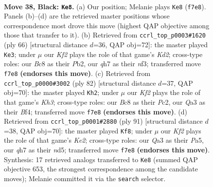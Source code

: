 \documentclass[11pt]{article}
\begin{document}
\clearpage

\begin{figure}[p]\centering
\begin{subfigure}{0.46\textwidth}\centering
\resizebox{\linewidth}{!}{%
\newchessgame
\chessboard[
  setfen={r1b5/5k1Q/2p1p3/p3P3/P4P2/q7/4K3/6N1 b - - 9 38},
  showmover=false,
  pgfstyle=straightmove, color=movearrow, markmove={f7-e8}
]}
\caption{}
\end{subfigure}\hfill
\begin{subfigure}{0.46\textwidth}\centering
\resizebox{\linewidth}{!}{%
\newchessgame
\chessboard[
  setfen={4nbB1/8/p4k2/8/1p6/5n2/PPPK4/7R w - - 0 34},
  showmover=false,
  pgfstyle=straightmove, color=movearrow, markmove={d2-e3}
]}
\caption{}
\end{subfigure}
\\[4pt]
\begin{subfigure}{0.46\textwidth}\centering
\resizebox{\linewidth}{!}{%
\newchessgame
\chessboard[
  setfen={8/3B3p/p4k2/2p2p2/P4B2/6PK/1RP5/5q2 w - - 1 42},
  showmover=false,
  pgfstyle=straightmove, color=movearrow, markmove={h3-h2}
]}
\caption{}
\end{subfigure}\hfill
\begin{subfigure}{0.46\textwidth}\centering
\resizebox{\linewidth}{!}{%
\newchessgame
\chessboard[
  setfen={8/4kp2/8/p2NP1pp/P1B5/4P1Pr/8/3K4 b - - 1 46},
  showmover=false,
  pgfstyle=straightmove, color=movearrow, markmove={e7-f8}
]}
\caption{}
\end{subfigure}
\caption{\textbf{Move 38, Black: \texttt{Ke8}.} (a) Our position; Melanie plays \texttt{Ke8} (\texttt{f7e8}). Panels (b)--(d) are the retrieved master positions whose correspondence most drove this move (highest QAP objective among those that transfer to it). (b) Retrieved from \texttt{ccrl\_top\_p0003\#1620} (ply 66) [structural distance $d$=36, QAP obj=72]: the master played \texttt{Ke3}; under $\mu$ our \emph{Kf2} plays the role of that game's \emph{Kd2}; cross-type roles: our \emph{B}c8 as their \emph{P}b2, our \emph{q}h7 as their \emph{n}f3; transferred move \texttt{f7e8} \textbf{(endorses this move)}. (c) Retrieved from \texttt{ccrl\_top\_p0000\#3002} (ply 82) [structural distance $d$=37, QAP obj=70]: the master played \texttt{Kh2}; under $\mu$ our \emph{Kf2} plays the role of that game's \emph{Kh3}; cross-type roles: our \emph{B}c8 as their \emph{P}c2, our \emph{Q}a3 as their \emph{B}f4; transferred move \texttt{f7e8} \textbf{(endorses this move)}. (d) Retrieved from \texttt{ccrl\_top\_p0001\#2880} (ply 91) [structural distance $d$=38, QAP obj=70]: the master played \texttt{Kf8}; under $\mu$ our \emph{Kf2} plays the role of that game's \emph{Ke2}; cross-type roles: our \emph{Q}a3 as their \emph{P}a5, our \emph{q}h7 as their \emph{n}d5; transferred move \texttt{f7e8} \textbf{(endorses this move)}. Synthesis: 17 retrieved analogs transferred to \texttt{Ke8} (summed QAP objective 653, the strongest correspondence among the candidate moves); Melanie committed it via the \texttt{search} selector.}
\label{fig:thought-m75}
\end{figure}
\end{document}
